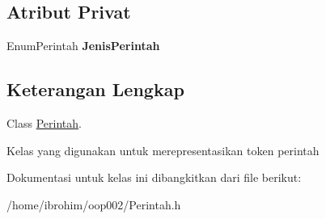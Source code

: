 \subsection*{Atribut Privat}
\begin{DoxyCompactItemize}
\item 
\hypertarget{classPerintah_a6958b9f17af67b3cf6702e398bc7bd6b}{}Enum\+Perintah {\bfseries Jenis\+Perintah}\label{classPerintah_a6958b9f17af67b3cf6702e398bc7bd6b}

\end{DoxyCompactItemize}


\subsection{Keterangan Lengkap}
Class \hyperlink{classPerintah}{Perintah}. 

Kelas yang digunakan untuk merepresentasikan token perintah 

Dokumentasi untuk kelas ini dibangkitkan dari file berikut\+:\begin{DoxyCompactItemize}
\item 
/home/ibrohim/oop002/Perintah.\+h\end{DoxyCompactItemize}
